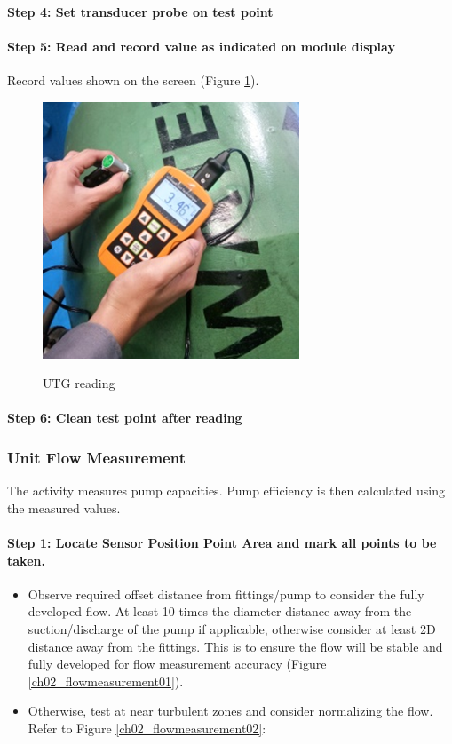 \paragraph{Step 4: Set transducer probe on test point}

\paragraph{Step 5: Read and record value as indicated on module display}
Record values shown on the screen (Figure \ref{ch02_utgreading}).

\begin{figure}[!htb]
	\includegraphics[scale=2]{figures/ch02_utgreading} \\
	\caption{UTG reading}
	\label{ch02_utgreading} 
\end{figure}

\paragraph{Step 6: Clean test point after reading}

\subsubsection{Unit Flow Measurement}
The activity measures pump capacities. Pump efficiency is then calculated using the measured values.  

\paragraph{Step 1: Locate Sensor Position Point Area and mark all points to be taken.}
\begin{itemize}
\item Observe required offset distance from fittings/pump to consider the fully developed flow. At least 10 times the diameter distance away from the suction/discharge of the pump if applicable, otherwise consider at least 2D distance away from the fittings. This is to ensure the flow will be stable and fully developed for flow measurement accuracy (Figure \ref{ch02_flowmeasurement01}).
\item Otherwise, test at near turbulent zones and consider normalizing the flow. Refer to Figure \ref{ch02_flowmeasurement02}:
\end{itemize}

